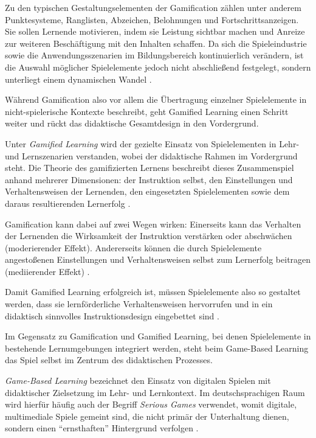 Zu den typischen Gestaltungselementen der Gamification zählen unter anderem Punktesysteme, Ranglisten, Abzeichen, Belohnungen und Fortschrittsanzeigen. Sie sollen Lernende motivieren, indem sie Leistung sichtbar machen und Anreize zur weiteren Beschäftigung mit den Inhalten schaffen. Da sich die Spieleindustrie sowie die Anwendungsszenarien im Bildungsbereich kontinuierlich verändern, ist die Auswahl möglicher Spielelemente jedoch nicht abschließend festgelegt, sondern unterliegt einem dynamischen Wandel \parencite[S.~2f]{hamari_does_2014}.

Während Gamification also vor allem die Übertragung einzelner Spielelemente in nicht-spielerische Kontexte beschreibt, geht Gamified Learning einen Schritt weiter und rückt das didaktische Gesamtdesign in den Vordergrund.

Unter \textit{Gamified Learning} wird der gezielte Einsatz von
Spielelementen in Lehr- und Lernszenarien verstanden, wobei der
didaktische Rahmen im Vordergrund steht. Die Theorie des
gamifizierten Lernens beschreibt dieses Zusammenspiel anhand
mehrerer Dimensionen: der Instruktion selbst, den Einstellungen
und Verhaltensweisen der Lernenden, den eingesetzten Spielelementen
sowie dem daraus resultierenden Lernerfolg \parencites[S.~6f]{landers_developing_2014}[S.~453]{schlag_gamifizierung_2021}.

Gamification kann dabei auf zwei Wegen wirken: Einerseits kann das
Verhalten der Lernenden die Wirksamkeit der Instruktion verstärken
oder abschwächen (moderierender Effekt). Andererseits können die
durch Spielelemente angestoßenen Einstellungen und Verhaltensweisen
selbst zum Lernerfolg beitragen (mediierender Effekt) \parencites[S.~6f]{landers_developing_2014}[S.~453]{schlag_gamifizierung_2021}.

Damit Gamified Learning erfolgreich ist, müssen Spielelemente also
so gestaltet werden, dass sie lernförderliche Verhaltensweisen
hervorrufen und in ein didaktisch sinnvolles Instruktionsdesign
eingebettet sind \parencites[S.~6f]{landers_developing_2014}[S.~453]{schlag_gamifizierung_2021}.

Im Gegensatz zu Gamification und Gamified Learning, bei denen Spielelemente in bestehende Lernumgebungen integriert werden, steht beim Game-Based Learning das Spiel selbst im Zentrum des didaktischen Prozesses.

\textit{Game-Based Learning} bezeichnet den Einsatz von digitalen
Spielen mit didaktischer Zielsetzung im Lehr- und Lernkontext. Im
deutschsprachigen Raum wird hierfür häufig auch der Begriff
\textit{Serious Games} verwendet, womit digitale, multimediale Spiele
gemeint sind, die nicht primär der Unterhaltung dienen, sondern einen
\enquote{ernsthaften} Hintergrund verfolgen \parencite[S.~14]{niegemann_kompendium_2008}.

